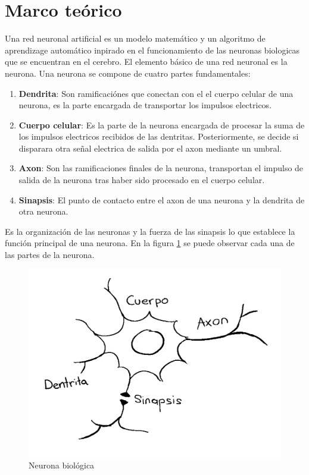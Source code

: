 \documentclass{article}
\begin{document}
\section{Marco teórico}\label{sec:Marco}
Una red neuronal artificial es un modelo matemático y un algoritmo de aprendizage automático inpirado en el funcionamiento de las neuronas biologicas que se encuentran en el cerebro.
El elemento básico de una red neuronal es la neurona. Una neurona se compone de cuatro partes fundamentales:
\begin{enumerate}
    \item \textbf{Dendrita}: Son ramificaciónes que conectan con el el cuerpo celular de una neurona, es la parte encargada de transportar los impulsos electricos.  
    \item \textbf{Cuerpo celular}: Es la parte de la neurona encargada de procesar la suma de los impulsos electricos recibidos de las dentritas. Posteriormente, se decide si disparara otra señal electrica de salida por el axon mediante un umbral.
    \item \textbf{Axon}: Son las ramificaciones finales de la neurona, transportan el impulso de salida de la neurona tras haber sido procesado en el cuerpo celular.
    \item \textbf{Sinapsis}: El punto de contacto entre el axon de una neurona y la dendrita de otra neurona. 
\end{enumerate}
Es la organización de las neuronas y la fuerza de las sinapsis lo que establece la función principal de una neurona. En la figura \ref{neuron} se puede observar cada una de las partes de la neurona. 
\begin{figure}[H]
    \centering
    \includegraphics[width=130mm]{neuron.png}
    \caption{Neurona biológica}
    \label{neuron}
\end{figure}
\end{document}
